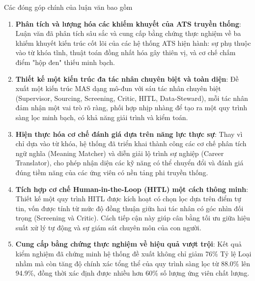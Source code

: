 \documentclass{article}
\begin{document}
\begin{itemize}[topsep=0pt, itemsep=4pt, leftmargin=40pt]
Các đóng góp chính của luận văn bao gồm
\begin{enumerate}[topsep=0pt, itemsep=4pt, leftmargin=40pt, label=\arabic*.]
    \item \textbf{Phân tích và lượng hóa các khiếm khuyết của ATS truyền thống}: Luận văn đã phân tích sâu sắc và cung cấp bằng chứng thực nghiệm về ba khiếm khuyết kiến trúc cốt lõi của các hệ thống ATS hiện hành: sự phụ thuộc vào từ khóa tĩnh, thuật toán đồng nhất hóa gây thiên vị, và cơ chế chấm điểm "hộp đen" thiếu minh bạch.
    \item \textbf{Thiết kế một kiến trúc đa tác nhân chuyên biệt và toàn diện}: Đề xuất một kiến trúc MAS dạng mô-đun với sáu tác nhân chuyên biệt (Supervisor, Sourcing, Screening, Critic, HITL, Data-Steward), mỗi tác nhân đảm nhận một vai trò rõ ràng, phối hợp nhịp nhàng để tạo ra một quy trình sàng lọc minh bạch, có khả năng giải trình và kiểm toán.
    \item \textbf{Hiện thực hóa cơ chế đánh giá dựa trên năng lực thực sự}: Thay vì chỉ dựa vào từ khóa, hệ thống đã triển khai thành công các cơ chế phân tích ngữ nghĩa (Meaning Matcher) và diễn giải lộ trình sự nghiệp (Career Translator), cho phép nhận diện các kỹ năng có thể chuyển đổi và đánh giá đúng tiềm năng của các ứng viên có nền tảng phi truyền thống.
    \item \textbf{Tích hợp cơ chế Human-in-the-Loop (HITL) một cách thông minh}: Thiết kế một quy trình HITL được kích hoạt có chọn lọc dựa trên điểm tự tin, vốn được tính từ mức độ đồng thuận giữa hai tác nhân có góc nhìn đối trọng (Screening và Critic). Cách tiếp cận này giúp cân bằng tối ưu giữa hiệu suất xử lý tự động và sự giám sát chuyên môn của con người.
    \item \textbf{Cung cấp bằng chứng thực nghiệm về hiệu quả vượt trội}: Kết quả kiểm nghiệm đã chứng minh hệ thống đề xuất không chỉ giảm 76\% Tỷ lệ Loại nhầm mà còn tăng độ chính xác tổng thể của quy trình sàng lọc từ 88.0\% lên 94.9\%, đồng thời xác định được nhiều hơn 60\% số lượng ứng viên chất lượng.
\end{enumerate}


\end{itemize}
\end{document}
